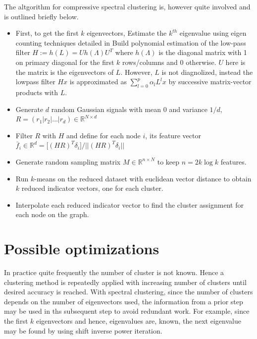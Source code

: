 \documentclass[10pt,a4paper, nocenter]{report}
\newcommand{\norm}[1]{\lvert\lvert {#1} \rvert\rvert}
\begin{document}
    The altgorithm for compressive spectral clustering is, however quite involved and is outlined briefly below. 

    \begin{itemize}
        \item First, to get the first $k$ eigenvectors,  
            \subitem Estimate the $k^{th}$ eigenvalue using eigen counting techniques detailed in \cite{Di13efficientestimation} 
            \subitem Build polynomial estimation of the low-pass filter $H := h(L) = U h(\Lambda) U^T$ where $h({\Lambda})$ is the diagonal matrix with 1 on primary diagonal for the first $k$ rows/columns and 0 otherwise. $U$ here is the matrix is the eigenvectors of $L$. However, $L$ is not diagnolized, instead the lowpass filter $Hx$ is approximated as $\sum_{l=0}^{p}\alpha_l L^{l}x$ by successive matrix-vector products with $L$.
        \item  Generate $d$ random Gaussian signals with mean $0$ and variance $1/d$, $R = (r_1|r_2|\dots|r_d) \in \mathbb{R}^{N\times d}$
        \item Filter $R$ with $H$ and define for each node $i$, its feature vector $\bar{f}_i \in \mathbb{R}^d = \big[ (HR)^T \delta_i \big] / \norm{(HR)^T \delta_i} $
        \item Generate random sampling matrix $M\in \mathbb{R}^{n\times N}$ to keep $n=2k \log{k}$ features. 
        \item Run $k$-means on the reduced dataset with euclidean vector distance to obtain $k$ reduced indicator vectors, one for each cluster. 
        \item Interpolate each reduced indicator vector to find the cluster assignment for each node on the graph.
    \end{itemize}

    \chapter{Possible optimizations}
    In practice quite frequently the number of cluster is not known. Hence a clustering method is repeatedly applied with increasing number of clusters until desired accuracy is reached. With spectral clustering, since the number of clusters depends on the number of eigenvectors used, the information from a prior step may be used in ths subsequent step to avoid redundant work. For example, since the first $k$ eigenvectors and hence, eigenvalues are, known, the next eigenvalue may be found by using shift inverse power iteration. 
\end{document}
